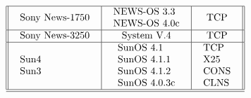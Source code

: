 \[\begin{tabular}[h]{||l|c|c||}
\hline
\begin{tabular}{l} Sony News-1750 \end{tabular} & \begin{tabular}{l} NEWS-OS 3.3\\NEWS-OS 4.0c \end{tabular} & \begin{tabular}{l} TCP \end{tabular} \\
\hline
\begin{tabular}{l} Sony News-3250 \end{tabular} & \begin{tabular}{l} System V.4 \end{tabular} & \begin{tabular}{l} TCP \end{tabular} \\
\hline
\begin{tabular}{l} Sun4\\Sun3 \end{tabular} & \begin{tabular}{l} SunOS 4.1\\SunOS 4.1.1\\SunOS 4.1.2\\SunOS 4.0.3c  \end{tabular} & \begin{tabular}{l} TCP\\X25\\CONS\\CLNS \end{tabular} \\
\hline
\hline
\end{tabular}\\[3ex]
\]

